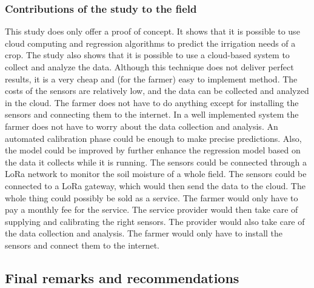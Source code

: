 \documentclass[11pt]{scrartcl} %
\begin{document}
\subsubsection{Contributions of the study to the field}
This study does only offer a proof of concept. It shows that it is possible to use cloud computing and regression algorithms to predict the irrigation needs of a crop. The study also shows that it is possible to use a cloud-based system to collect and analyze the data.
\newline Although this technique does not deliver perfect results, it is a very cheap and (for the farmer) easy to implement method. The costs of the sensors are relatively low, and the data can be collected and analyzed in the cloud. The farmer does not have to do anything except for installing the sensors and connecting them to the internet. In a well implemented system the farmer does not have to worry about the data collection and analysis. An automated calibration phase could be enough to make precise predictions. Also, the model could be improved by further enhance the regression model based on the data it collects while it is running.
\newline The sensors could be connected through a LoRa network to monitor the soil moisture of a whole field. The sensors could be connected to a LoRa gateway, which would then send the data to the cloud.
\newline The whole thing could possibly be sold as a service. The farmer would only have to pay a monthly fee for the service. The service provider would then take care of supplying and calibrating the right sensors. The provider would also take care of the data collection and analysis. The farmer would only have to install the sensors and connect them to the internet.
\subsection{Final remarks and recommendations}


\newpage
\printbibliography[title=References]
\end{document}
